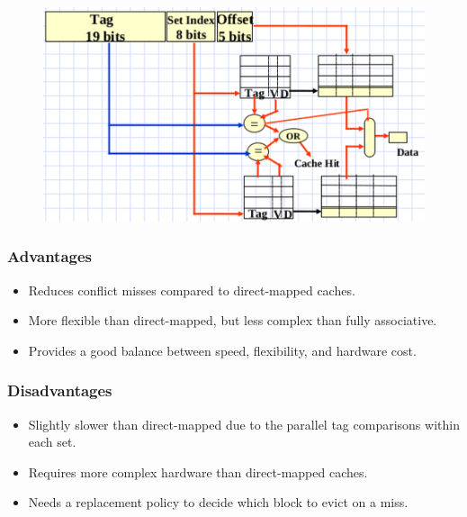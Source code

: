 \documentclass[12pt]{book}
\begin{document}
\begin{figure}[ht]
    \centering
    \includegraphics[width=0.7\linewidth]{images/2way_set.png}
\end{figure}
\subsubsection*{Advantages}
\begin{itemize}
    \item Reduces conflict misses compared to direct-mapped caches.
    \item More flexible than direct-mapped, but less complex than fully associative.
    \item Provides a good balance between speed, flexibility, and hardware cost.
\end{itemize}

\subsubsection*{Disadvantages}
\begin{itemize}
    \item Slightly slower than direct-mapped due to the parallel tag comparisons within each set.
    \item Requires more complex hardware than direct-mapped caches.
    \item Needs a replacement policy to decide which block to evict on a miss.
\end{itemize}
\end{document}
